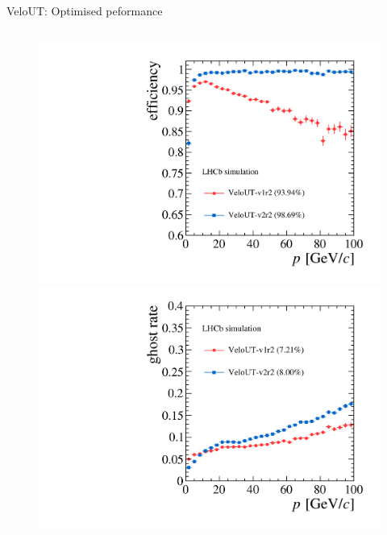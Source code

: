 \documentclass[aspectratio=1610]{beamer}
\begin{document}
\begin{frame}{VeloUT: Optimised peformance}
\begin{columns}
\begin{column}{0.35\textwidth}
\centering
\begin{figure}
\vspace*{-1cm}
\includegraphics[height=0.475\textheight]{figs/upstream-tracking-upgrade/eff_p_comp.pdf}\\
\includegraphics[height=0.475\textheight]{figs/upstream-tracking-upgrade/gr_p_comp.pdf}
\end{figure}
\end{column}
\end{columns}

\end{frame}
\end{document}
